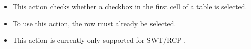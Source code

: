 

\begin{itemize}
\item This action checks whether a checkbox in the first cell of a table is selected.
 \item To use this action, the row must already be selected. 
\item This action is currently only supported for SWT/RCP \gdauts{}.
\end{itemize}
